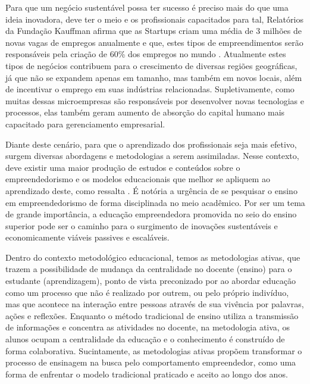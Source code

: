 Para que um negócio sustentável possa ter sucesso é preciso mais do que uma ideia inovadora, deve ter o meio e os profissionais capacitados para tal, Relatórios da Fundação Kauffman afirma que as Startups criam uma média de 3 milhões de novas vagas de empregos anualmente e que, estes tipos de empreendimentos serão responsáveis pela criação de 60\% dos empregos no  mundo  \cite{brasil_o_2017}. 
Atualmente estes tipos de  negócios contribuem para o crescimento de diversas regiões geográficas, já que não se expandem apenas em tamanho, mas também em novos locais, além de incentivar o emprego em suas indústrias relacionadas. Supletivamente, como muitas dessas microempresas são responsáveis por desenvolver novas tecnologias e processos, elas também geram aumento de absorção do capital humano mais capacitado para gerenciamento empresarial.

Diante deste cenário, para que o aprendizado dos profissionais seja mais efetivo, surgem diversas abordagens e metodologias a serem assimiladas. Nesse contexto, deve existir uma maior produção de estudos e conteúdos sobre o empreendedorismo e os modelos educacionais que melhor se apliquem ao aprendizado deste, como ressalta . É notória a urgência de se pesquisar o ensino em empreendedorismo de forma disciplinada no meio acadêmico. Por ser um tema de grande importância, a educação empreendedora promovida no seio do ensino superior pode ser o caminho para o surgimento de inovações sustentáveis e economicamente viáveis passives e escaláveis.

Dentro do contexto metodológico educacional, temos as metodologias ativas, que trazem a possibilidade de mudança da centralidade no docente (ensino) para o estudante (aprendizagem), ponto de vista preconizado por  ao abordar educação como um processo que não é realizado por outrem, ou pelo próprio indivíduo, mas que acontece na interação entre pessoas através de sua vivência por palavras, ações e reflexões. 
Enquanto o método tradicional de ensino utiliza a transmissão de informações e concentra as atividades no docente, na metodologia ativa, os alunos ocupam a centralidade da educação e o conhecimento é construído de forma colaborativa. Sucintamente, as metodologias ativas propõem transformar o processo de ensinagem na busca pelo comportamento empreendedor, como uma forma de enfrentar o modelo tradicional praticado e aceito ao longo dos anos.
 
